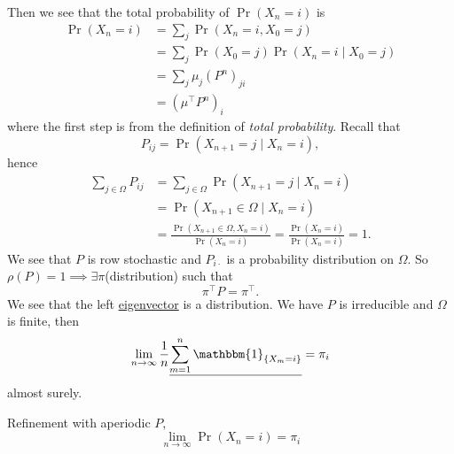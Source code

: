 \begin{itemize}
	      Then we see that the total probability of \(\Pr(X_n = i)\) is
	      \[
		      \begin{split}
			      \Pr(X_n = i) & = \sum_j \Pr(X_n = i, X_0 = j)                   \\
			                   & = \sum_j \Pr(X_0 = j)\Pr(X_n = i  \mid  X_0 = j) \\
			                   & =\sum_j \mu_{j} (P^n)_{ji}                       \\
			                   & = (\mu^{\top} P^n)_i
		      \end{split}
	      \]
	      where the first step is from the definition of \emph{total probability}. Recall that
	      \[
		      P_{ij} = \Pr(X_{n+1} = j \mid X_n = i),
	      \]
	      hence
	      \[
		      \begin{split}
			      \sum_{j\in \Omega} P_{ij} & = \sum_{j\in \Omega} \Pr(X_{n+1} = j \mid X_n = i)     \\
			                                & = \Pr(X_{n+1}\in \Omega \mid X_n = i)                  \\
			                                & = \frac{\Pr(X_{n+1}\in \Omega, X_n = i)}{\Pr(X_n = i)}
			      = \frac{\Pr(X_n = i)}{\Pr(X_n = i)}
			      = 1.
		      \end{split}
	      \]
	      We see that \(P\) is row stochastic and \(P_{i\cdot}\) is a probability distribution on \(\Omega\). So \(\rho(P) = 1\implies \exists  \pi\)(distribution) such that
	      \[
		      \pi^{\top} P = \pi^{\top}.
	      \]
	      We see that the left \hyperref[def:eigenvector]{eigenvector} is a distribution. We have \(P\) is irreducible and \(\Omega\) is finite, then
	      \[
		      \lim_{n\to \infty } \frac{1}{n}\underline{\sum\limits_{m=1}^{n}  \mathbbm{1}_{\left\{ X_m = i \right\} }} = \pi_i
	      \]
	      almost surely.
\end{itemize}

Refinement with aperiodic \(P\),
\[
	\lim_{n\to \infty }\Pr(X_n = i) = \pi_i
\]